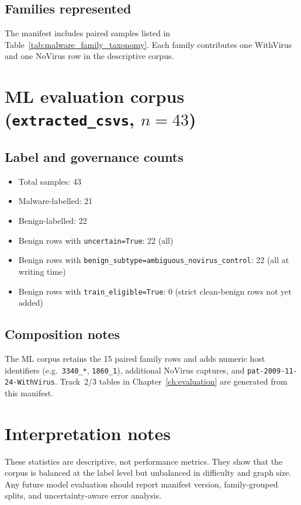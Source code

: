 \subsection{Families represented}
The manifest includes paired samples listed in Table~\ref{tab:malware_family_taxonomy}. Each family contributes one WithVirus and one NoVirus row in the descriptive corpus.

\section{ML evaluation corpus (\texttt{extracted\_csvs}, $n{=}43$)}

\subsection{Label and governance counts}
\begin{itemize}
\item Total samples: 43
\item Malware-labelled: 21
\item Benign-labelled: 22
\item Benign rows with \texttt{uncertain=True}: 22 (all)
\item Benign rows with \texttt{benign\_subtype=ambiguous\_novirus\_control}: 22 (all at writing time)
\item Benign rows with \texttt{train\_eligible=True}: 0 (strict clean-benign rows not yet added)
\end{itemize}

\subsection{Composition notes}
The ML corpus retains the 15 paired family rows and adds numeric host identifiers (e.g.\ \texttt{3340\_*}, \texttt{1860\_1}), additional NoVirus captures, and \texttt{pat-2009-11-24-WithVirus}. Track~2/3 tables in Chapter~\ref{ch:evaluation} are generated from this manifest.

\section{Interpretation notes}
These statistics are descriptive, not performance metrics. They show that the corpus is balanced at the label level but unbalanced in difficulty and graph size. Any future model evaluation should report manifest version, family-grouped splits, and uncertainty-aware error analysis.


